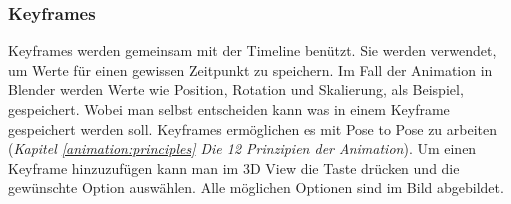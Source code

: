 \subsubsection{Keyframes}
Keyframes werden gemeinsam mit der Timeline benützt. Sie werden verwendet, um Werte für einen gewissen Zeitpunkt zu speichern.
Im Fall der Animation in Blender werden Werte wie Position, Rotation und Skalierung, als Beispiel, gespeichert. Wobei man selbst entscheiden
kann was in einem Keyframe gespeichert werden soll. Keyframes ermöglichen es mit Pose to Pose zu arbeiten (\textit{Kapitel \dq \ref{animation:principles} Die 12 Prinzipien der Animation\dq}).
Um einen Keyframe hinzuzufügen kann man im 3D View die Taste  drücken und die gewünschte Option auswählen. Alle möglichen Optionen sind im Bild abgebildet.
\citep{Blender:Keyframes}

